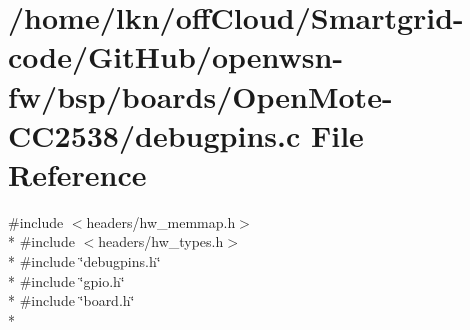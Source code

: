 \hypertarget{_open_mote-_c_c2538_2debugpins_8c}{}\section{/home/lkn/off\+Cloud/\+Smartgrid-\/code/\+Git\+Hub/openwsn-\/fw/bsp/boards/\+Open\+Mote-\/\+C\+C2538/debugpins.c File Reference}
\label{_open_mote-_c_c2538_2debugpins_8c}
{\ttfamily \#include $<$headers/hw\+\_\+memmap.\+h$>$}\\*
{\ttfamily \#include $<$headers/hw\+\_\+types.\+h$>$}\\*
{\ttfamily \#include \char`\"{}debugpins.\+h\char`\"{}}\\*
{\ttfamily \#include \char`\"{}gpio.\+h\char`\"{}}\\*
{\ttfamily \#include \char`\"{}board.\+h\char`\"{}}\\*
